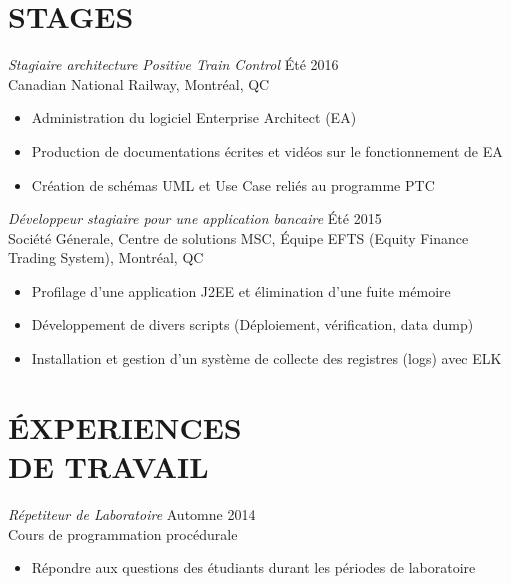 \documentclass[margin, 10pt]{res} %
\begin{document}
\begin{resume}
\section{ STAGES}

{\sl Stagiaire architecture Positive Train Control} \hfill \'Et\'e 2016 \\
Canadian National Railway, Montr\'eal, QC
\begin{itemize} \itemsep -2pt %
\item Administration du logiciel Enterprise Architect (EA)
\item Production de documentations \'ecrites et vid\'eos sur le fonctionnement de EA
\item Cr\'eation de sch\'emas UML et Use Case reli\'es au programme PTC
\end{itemize}

{\sl D\'eveloppeur stagiaire pour une application bancaire} \hfill \'Et\'e 2015 \\
Soci\'et\' e G\'enerale, Centre de solutions MSC, \'Equipe EFTS (Equity Finance Trading System), Montr\'eal, QC
\begin{itemize} \itemsep -2pt %
\item Profilage d'une application J2EE et \'elimination d'une fuite m\'emoire
\item  D\'eveloppement de divers scripts (D\'eploiement, v\'erification, data dump)
\item  Installation et gestion d'un syst\`eme de collecte des registres (logs) avec ELK
\end{itemize}
 
 
\section{\'EXPERIENCES \\ DE TRAVAIL}

{\sl R\'epetiteur de Laboratoire} \hfill Automne 2014 \\
Cours de programmation proc\'edurale
\begin{itemize} \itemsep -2pt %
\item R\'epondre aux questions des \'etudiants durant les p\'eriodes de laboratoire
\end{itemize}


\end{resume}
\end{document}
